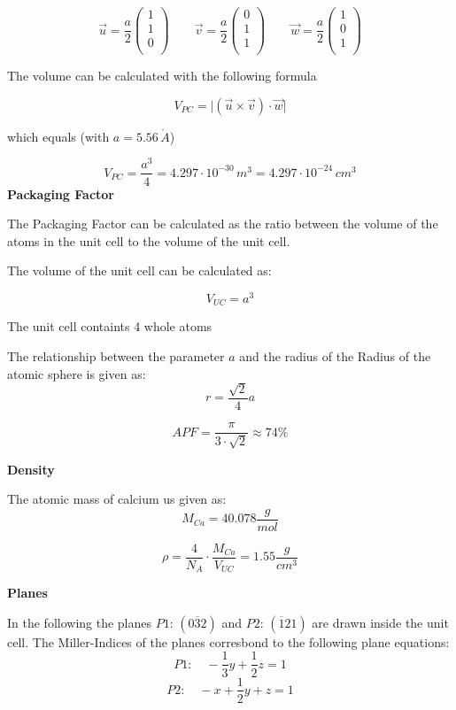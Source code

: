 $$\vec{u} = \frac{a}{2} \left(\begin{matrix}1\\1\\0\\\end{matrix}\right) \qquad
  \vec{v} = \frac{a}{2} \left(\begin{matrix}0\\1\\1\\\end{matrix}\right) \qquad
  \vec{w} = \frac{a}{2} \left(\begin{matrix}1\\0\\1\\\end{matrix}\right)$$

The volume can be calculated with the following formula

$$V_{PC} = \vert (\vec{u} \times \vec{v})  \cdot \vec{w} \vert$$

which equals (with $a = 5.56 \, \mathring{A}$)

$$V_{PC} = \frac{a^3}{4} = 4.297 \cdot 10^{-30} \,m^3 = 4.297 \cdot 10^{-24} \,cm^3$$
\textbf{Packaging Factor}

The Packaging Factor can be calculated as the ratio between the
volume of the atoms in the unit cell to the volume of the unit cell.

The volume of the unit cell can be calculated as:

$$V_{UC} = a^3$$


The unit cell containts 4 whole atoms 

The relationship between the parameter $a$ and the radius of the Radius of the atomic sphere is given as:
$$r = \frac{\sqrt{2}}{4} a $$

$$APF = \frac{\pi}{3 \cdot \sqrt{2}} \approx 74\%$$


\textbf{Density}

The atomic mass of calcium us given as:
$$M_{Ca} = 40.078 \frac{g}{mol}$$


$$\rho = \frac{4}{N_A} \cdot \frac{M_{Ca}}{V_{UC}} = 1.55 \frac{g}{cm^3}$$


\textbf{Planes}

In the following the planes $P1: \, (0\overline{3}2)$ and $P2: \,(\overline{1}21)$ are drawn inside the unit cell.
The Miller-Indices of the planes corresbond to the following plane equations:
$$P1: \quad -\frac{1}{3} y + \frac{1}{2} z = 1$$
$$P2: \quad -x +\frac{1}{2} y + z = 1$$

